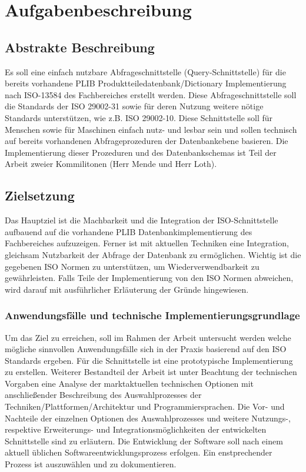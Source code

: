 \chapter{Aufgabenbeschreibung} \label{Aufgabenbeschreibung}

\section{Abstrakte Beschreibung}

Es soll eine einfach nutzbare Abfrageschnittstelle (Query-Schnittstelle) für die bereits vorhandene PLIB Produktteiledatenbank/Dictionary Implementierung nach ISO-13584 des Fachbereiches erstellt werden. Diese Abfrageschnittstelle soll die Standards der ISO 29002-31 sowie für deren Nutzung weitere nötige Standards unterstützen, wie z.B. ISO 29002-10. Diese Schnittstelle soll für Menschen sowie für Maschinen einfach nutz- und lesbar sein und sollen technisch auf bereits vorhandenen Abfrageprozeduren der Datenbankebene basieren. Die Implementierung dieser Prozeduren und des Datenbankschemas ist Teil der Arbeit zweier Kommilitonen (Herr Mende und Herr Loth).

\section{Zielsetzung}

Das Hauptziel ist die Machbarkeit und die Integration der ISO-Schnittstelle aufbauend auf die vorhandene PLIB Datenbankimplementierung des Fachbereiches aufzuzeigen. 
Ferner ist mit aktuellen Techniken eine Integration, gleichsam Nutzbarkeit der Abfrage der Datenbank zu ermöglichen. Wichtig ist die gegebenen ISO Normen zu unterstützen, um Wiederverwendbarkeit zu gewährleisten. Falls Teile der Implementierung von den ISO Normen abweichen, wird darauf mit ausführlicher Erläuterung der Gründe hingewiesen. 

\subsection{Anwendungsfälle und technische Implementierungsgrundlage}

Um das Ziel zu erreichen, soll im Rahmen der Arbeit untersucht werden welche mögliche sinnvollen Anwendungsfälle sich in der Praxis basierend auf den ISO Standards ergeben. Für die Schnittstelle ist eine prototypische Implementierung zu erstellen. Weiterer Bestandteil der Arbeit ist unter Beachtung der technischen Vorgaben eine Analyse der marktaktuellen technischen Optionen mit anschließender Beschreibung des Auswahlprozesses der Techniken/Plattformen/Architektur und Programmiersprachen. Die Vor- und Nachteile der einzelnen Optionen des Auswahlprozesses und weitere Nutzungs-, respektive Erweiterungs- und Integrationsmöglichkeiten der entwickelten Schnittstelle sind zu erläutern. 
Die Entwicklung der Software soll nach einem aktuell üblichen Softwareentwicklungsprozess erfolgen. Ein enstprechender Prozess ist auszuwählen und zu dokumentieren. 

